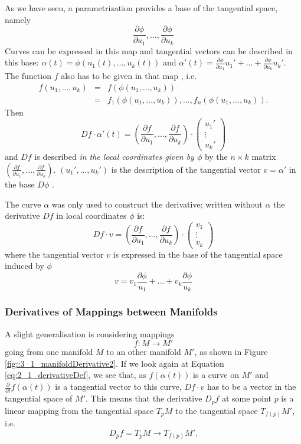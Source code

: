 As we have seen, a parametrization provides a base of the tangential space, namely 
\[\frac{\partial\phi}{\partial u_1},..., \frac{\partial\phi}{\partial u_k}\] 
Curves can be expressed in this map and tangential vectors can be described in this base: $\alpha(t) = \phi(u_1(t),...,u_k(t))$ and $\alpha'(t) = \frac{\partial\phi}{\partial u_1} u_1' + ... + \frac{\partial\phi}{\partial u_k} u_k'$. The function $f$ also has to be given in that map , i.e. 
\begin{eqnarray*} f(u_1,...,u_k) &=& f(\phi(u_1,...,u_k)) \\
 &=& f_1(\phi(u_1,...,u_k)),...,f_n(\phi(u_1,...,u_k)). \end{eqnarray*} 
Then 
\[Df \cdot \alpha'(t) = (\frac{\partial f}{\partial u_1},..., \frac{\partial f}{\partial u_k}) \cdot \begin{pmatrix}
	u_1' \\ \vdots \\ u_k'\end{pmatrix}\]
and $Df$ is described \emph{in the local coordinates given by $\phi$} by the $ n \times k$ matrix $(\frac{\partial f}{\partial u_1},..., \frac{\partial f}{\partial u_k})$. $(u_1',...,u_k')$ is the description of the tangential vector $v = \alpha'$ in the base $D\phi$ . 

The curve $\alpha$ was only used to construct the derivative; written without $\alpha$ the derivative $Df$ in local coordinates $\phi$ is:
\[Df \cdot v = (\frac{\partial f}{\partial u_1},..., \frac{\partial f}{\partial u_k}) \cdot \begin{pmatrix}
	v_1 \\ \vdots \\ v_k\end{pmatrix}\]
where the tangential vector $v$ is expressed in the base of the tangential space induced by $\phi$
\[v = v_1 \frac{\partial \phi}{u_1} +...+ v_k \frac{\partial \phi}{u_k}\] 
\subsubsection*{Derivatives of Mappings between Manifolds}
A slight generalisation is considering mappings 
\[f:M\to M'\]
going from one manifold $M$ to an other manifold $M'$, as shown in Figure \ref{fig::3_1_manifoldDerivative2}. If we look again at Equation \ref{eq:2_1_derivativeDef}, we see that, as $f(\alpha(t))$ is a curve on $M'$ and $\frac{\partial}{\partial t}f(\alpha(t))$ is a tangential vector to this curve, $Df\cdot v$ has to be a vector in the tangential space of $M'$. This means that the derivative $D_pf$ at some point $p$ is a linear mapping from the tangential space $T_pM$  to the tangential space $T_{f(p)} M'$, i.e. 
\[D_p f = T_p M \rightarrow T_{f(p)} M'.\] 

